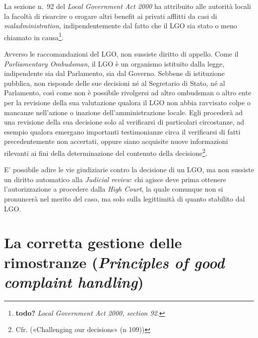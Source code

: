 \documentclass[12pt,it,a4paper,]{report}
\begin{document}
La sezione n.~92 del \emph{Local Government Act 2000} ha attribuito alle
autorità locali la facoltà di risarcire o erogare altri benefit ai
privati afflitti da casi di \emph{maladministration}, indipendentemente
dal fatto che il LGO sia stato o meno chiamato in causa\footnote{\textbf{todo?}
  \emph{Local Government Act 2000, section 92}.}.

Avverso le raccomandazioni del LGO, non sussiste diritto di appello.
Come il \emph{Parliamentary Ombudsman}, il LGO è un organismo istituito
dalla legge, indipendente sia dal Parlamento, sia dal Governo. Sebbene
di istituzione pubblica, non risponde delle sue decisioni né al
Segretario di Stato, né al Parlamento, così come non è possibile
rivolgersi ad altro ombudsman o altro ente per la revisione della sua
valutazione qualora il LGO non abbia ravvisato colpe o mancanze
nell'azione o inazione dell'amministrazione locale. Egli procederà ad
una revisione della sua decisione solo al verificarsi di particolari
circostanze, ad esempio qualora emergano importanti testimonianze circa
il verificarsi di fatti precedentemente non accertati, oppure siano
acquisite nuove informazioni rilevanti ai fini della determinazione del
contenuto della decisione\footnote{Cfr. ({«Challenging our decisions»}
  (n 109))}.

E' possibile adire le vie giudiziarie contro la decisione di un LGO, ma
non sussiste un diritto automatico alla \emph{Judicial review}: chi
agisce deve prima ottenere l'autorizzazione a procedere dalla \emph{High
Court}, la quale comunque non si pronuncerà nel merito del caso, ma solo
sulla legittimità di quanto stabilito dal LGO.

\hypertarget{la-corretta-gestione-delle-rimostranze-principles-of-good-complaint-handling}{%
\section{\texorpdfstring{La corretta gestione delle rimostranze
(\emph{Principles of good complaint
handling})}{La corretta gestione delle rimostranze (Principles of good complaint handling)}}\label{la-corretta-gestione-delle-rimostranze-principles-of-good-complaint-handling}}
\end{document}
